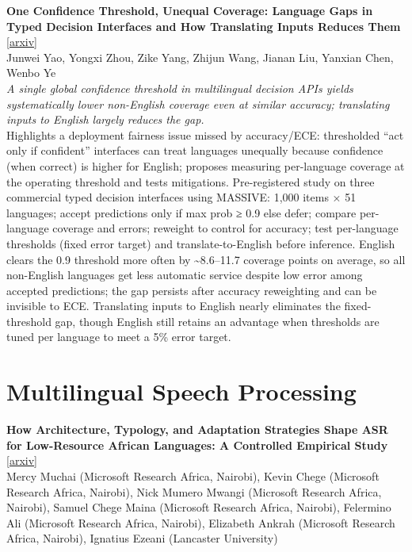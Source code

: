 \documentclass[12pt,letterpaper]{article}
\begin{document}
\medskip

{\small\textbf{One Confidence Threshold, Unequal Coverage: Language Gaps in Typed Decision Interfaces and How Translating Inputs Reduces Them}} {\scriptsize[\href{https://arxiv.org/abs/2610.37688}{arxiv}]}\\
{\scriptsize Junwei Yao, Yongxi Zhou, Zike Yang, Zhijun Wang, Jianan Liu, Yanxian Chen, Wenbo Ye}\\

{\small\textit{A single global confidence threshold in multilingual decision APIs yields systematically lower non-English coverage even at similar accuracy; translating inputs to English largely reduces the gap.}}\\[1pt]
{\footnotesize Highlights a deployment fairness issue missed by accuracy/ECE: thresholded ``act only if confident'' interfaces can treat languages unequally because confidence (when correct) is higher for English; proposes measuring per-language coverage at the operating threshold and tests mitigations. Pre-registered study on three commercial typed decision interfaces using MASSIVE: 1,000 items × 51 languages; accept predictions only if max prob ≥ 0.9 else defer; compare per-language coverage and errors; reweight to control for accuracy; test per-language thresholds (fixed error target) and translate-to-English before inference. English clears the 0.9 threshold more often by \textasciitilde{}8.6--11.7 coverage points on average, so all non-English languages get less automatic service despite low error among accepted predictions; the gap persists after accuracy reweighting and can be invisible to ECE. Translating inputs to English nearly eliminates the fixed-threshold gap, though English still retains an advantage when thresholds are tuned per language to meet a 5\% error target.}

\medskip


\section*{Multilingual Speech Processing}

{\small\textbf{How Architecture, Typology, and Adaptation Strategies Shape ASR for Low-Resource African Languages: A Controlled Empirical Study}} {\scriptsize[\href{https://arxiv.org/abs/2610.39004}{arxiv}]}\\
{\scriptsize Mercy Muchai (Microsoft Research Africa, Nairobi), Kevin Chege (Microsoft Research Africa, Nairobi), Nick Mumero Mwangi (Microsoft Research Africa, Nairobi), Samuel Chege Maina (Microsoft Research Africa, Nairobi), Felermino Ali (Microsoft Research Africa, Nairobi), Elizabeth Ankrah (Microsoft Research Africa, Nairobi), Ignatius Ezeani (Lancaster University)}\\
\end{document}
